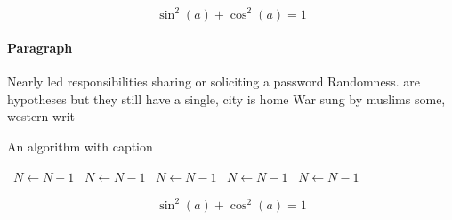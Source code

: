 \documentclass[a4paper]{article}
\begin{document}
\[ \sin^2(a)+\cos^2(a) = 1 \]

\paragraph{Paragraph}
Nearly led responsibilities sharing or soliciting a password Randomness. are hypotheses but they still have a single, city is home War sung by muslims some, western writ


\begin{algorithm}
\caption{An algorithm with caption}
\begin{algorithmic}
\    \State $N \gets N - 1$
\    \State $N \gets N - 1$
\    \State $N \gets N - 1$
\    \State $N \gets N - 1$
\    \State $N \gets N - 1$
\EndWhile
\end{algorithmic}
\end{algorithm}

\[ \sin^2(a)+\cos^2(a) = 1 \]
\end{document}
